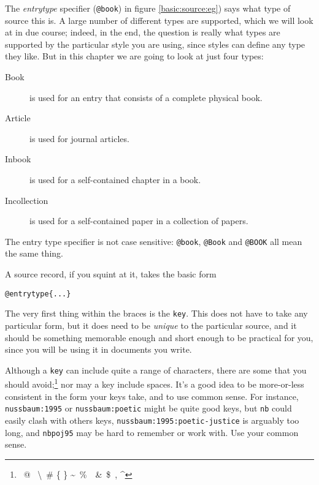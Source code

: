The \emph{entrytype} specifier (\verb|@book|) in figure
\ref{basic:source:eg}) says what type of source this is. A large
number of different types are supported, which we will look at in due
course; indeed, in the end, the question is really what types are
supported by the particular style you are using, since styles can
define any type they like. But in this chapter we are going to look at
just four types:
\begin{description}
\item[Book] is used for an entry that consists of a complete physical
  book.
\item[Article] is used for journal articles.
\item[Inbook] is used for a self-contained chapter in a
  book.
\item[Incollection] is used for a self-contained paper in a collection
  of papers.
\end{description}

The entry type specifier is not case sensitive: \verb|@book|,
\verb|@Book| and \verb|@BOOK| all mean the same thing.

A source record, if you squint at it, takes the basic form
\begin{center}\verb|@entrytype{...}|\end{center}The very first thing
within the braces is the \verb|key|. This does not have to take any
particular form, but it does need to be \emph{unique} to the
particular source, and it should be something memorable enough and
short enough to be practical for you, since you will be using it in
documents you write.

Although a \verb|key| can include quite a range of characters, there
are some that you should avoid;\footnote{{\ttfamily
      \textquotedbl\ @ \textquotesingle\
      \textbackslash\ \# \{ \}
      \textasciitilde\ \%\ \textunderscore\
      \&\ \$\ , \textasciicircum}} nor may a
key include spaces. It's a good idea to be more-or-less consistent
in the form your keys take, and to use common sense. For instance,
\texttt{nussbaum:1995} or \texttt{nussbaum:poetic} might be quite
good keys, but \texttt{nb} could easily clash with others keys,
\texttt{nussbaum:1995:poetic-justice} is arguably too long, and
\texttt{nbpoj95} may be hard to remember or work with. Use your
common sense.

